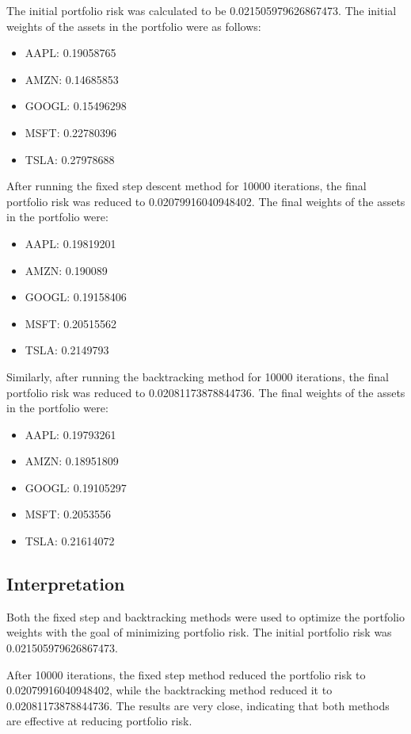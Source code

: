 \documentclass[12pt]{article}
\begin{document}
The initial portfolio risk was calculated to be 0.021505979626867473. The initial weights of the assets in the portfolio were as follows:

\begin{itemize}
    \item AAPL: 0.19058765
    \item AMZN: 0.14685853
    \item GOOGL: 0.15496298
    \item MSFT: 0.22780396
    \item TSLA: 0.27978688
\end{itemize}

After running the fixed step descent method for 10000 iterations, the final portfolio risk was reduced to 0.02079916040948402. The final weights of the assets in the portfolio were:

\begin{itemize}
    \item AAPL: 0.19819201
    \item AMZN: 0.190089
    \item GOOGL: 0.19158406
    \item MSFT: 0.20515562
    \item TSLA: 0.2149793
\end{itemize}

Similarly, after running the backtracking method for 10000 iterations, the final portfolio risk was reduced to 0.02081173878844736. The final weights of the assets in the portfolio were:

\begin{itemize}
    \item AAPL: 0.19793261
    \item AMZN: 0.18951809
    \item GOOGL: 0.19105297
    \item MSFT: 0.2053556
    \item TSLA: 0.21614072
\end{itemize}



\subsection*{Interpretation}

Both the fixed step and backtracking methods were used to optimize the portfolio weights with the goal of minimizing portfolio risk. The initial portfolio risk was 0.021505979626867473. 

After 10000 iterations, the fixed step method reduced the portfolio risk to 0.02079916040948402, while the backtracking method reduced it to 0.02081173878844736. The results are very close, indicating that both methods are effective at reducing portfolio risk. 
\end{document}
